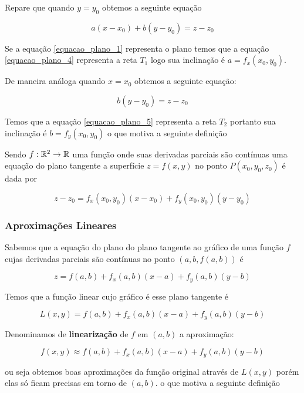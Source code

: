 Repare que quando $y = y_0$ obtemos a seguinte equação 

\begin{equation}
	a(x - x_0) + b(y - y_0) = z - z_0 
	\label{equacao_plano_4}
\end{equation}

Se a equação \ref{equacao_plano_1} representa o plano temos que a equação \ref{equacao_plano_4} representa a reta $T_1$ logo sua inclinação é $a = f_x(x_0, y_0)$. 

De maneira análoga quando $x = x_0$ obtemos a seguinte equação:

\begin{equation}
	b(y - y_0) = z - z_0 
	\label{equacao_plano_5}
\end{equation}

Temos que a equação \ref{equacao_plano_5} representa a reta $T_2$ portanto sua inclinação é $b = f_y(x_0, y_0)$ o que motiva a seguinte definição 

\begin{definition} Sendo $f: \mathbb{R}^2 \rightarrow \mathbb{R}$ uma função onde suas derivadas parciais são contínuas uma equação do plano tangente a superfície $z = f(x, y)$ no ponto $P(x_0, y_0, z_0)$ é dada por 

\[
	z - z_0 = f_x(x_0, y_0)(x - x_0) + f_y(x_0, y_0)(y - y_0) 
\]
\end{definition}

\subsubsection{Aproximações Lineares}

Sabemos que a equação do plano do plano tangente ao gráfico de uma função $f$ cujas derivadas parciais são contínuas no ponto $(a, b, f(a, b))$ é 

\[
z = f(a, b) + f_x(a, b)(x - a) + f_y(a, b)(y - b) 
\]

Temos que a função linear cujo gráfico é esse plano tangente é 

\[
	L(x, y) = f(a, b) + f_x(a, b)(x - a) + f_y(a, b)(y - b) 
\]

Denominamos de \textbf{linearização} de $f$ em $(a, b)$ a aproximação: 

\[
	f(x, y) \approx f(a, b) + f_x(a, b)(x - a) + f_y(a, b)(y - b) 
\]

ou seja obtemos boas aproximações da função original através de $L(x,y)$ porém elas só ficam precisas em torno de $(a, b)$. o que motiva a seguinte definição 

